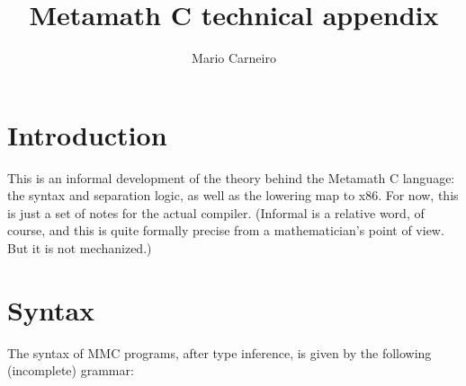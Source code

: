 \documentclass[acmsmall,nonacm]{acmart}
\begin{document}
\title{Metamath C technical appendix}

\author{Mario Carneiro}


\maketitle


\section{Introduction}

This is an informal development of the theory behind the Metamath C language: the syntax and separation logic, as well as the lowering map to x86. For now, this is just a set of notes for the actual compiler. (Informal is a relative word, of course, and this is quite formally precise from a mathematician's point of view. But it is not mechanized.)

\section{Syntax}

The syntax of MMC programs, after type inference, is given by the following (incomplete) grammar:
\end{document}
